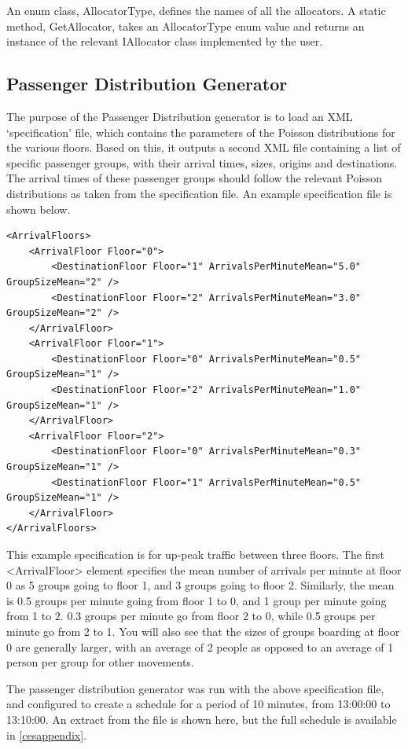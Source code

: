\documentclass{UoYCSproject}
\begin{document}
An enum class, AllocatorType, defines the names of all the allocators.  A static method, GetAllocator, takes an AllocatorType enum value and returns an instance of the relevant IAllocator class implemented by the user.

\subsection{Passenger Distribution Generator}

The purpose of the Passenger Distribution generator is to load an XML `specification' file, which contains the parameters of the Poisson distributions for the various floors.  Based on this, it outputs a second XML file containing a list of specific passenger groups, with their arrival times, sizes, origins and destinations.  The arrival times of these passenger groups should follow the relevant Poisson distributions as taken from the specification file.  An example specification file is shown below.

\lstset{language=XML, basicstyle=\ttfamily\tiny, breaklines=true, breakatwhitespace=true}
\begin{lstlisting}
<ArrivalFloors>
	<ArrivalFloor Floor="0">
		<DestinationFloor Floor="1" ArrivalsPerMinuteMean="5.0" GroupSizeMean="2" />
		<DestinationFloor Floor="2" ArrivalsPerMinuteMean="3.0" GroupSizeMean="2" />
	</ArrivalFloor>
	<ArrivalFloor Floor="1">
		<DestinationFloor Floor="0" ArrivalsPerMinuteMean="0.5" GroupSizeMean="1" />
		<DestinationFloor Floor="2" ArrivalsPerMinuteMean="1.0" GroupSizeMean="1" />
	</ArrivalFloor>
	<ArrivalFloor Floor="2">
		<DestinationFloor Floor="0" ArrivalsPerMinuteMean="0.3" GroupSizeMean="1" />
		<DestinationFloor Floor="1" ArrivalsPerMinuteMean="0.5" GroupSizeMean="1" />
	</ArrivalFloor>
</ArrivalFloors>
\end{lstlisting}

This example specification is for up-peak traffic between three floors.  The first <ArrivalFloor> element specifies the mean number of arrivals per minute at floor 0 as 5 groups going to floor 1, and 3 groups going to floor 2.  Similarly, the mean is 0.5 groups per minute going from floor 1 to 0, and 1 group per minute going from 1 to 2.  0.3 groups per minute go from floor 2 to 0, while 0.5 groups per minute go from 2 to 1.  You will also see that the sizes of groups boarding at floor 0 are generally larger, with an average of 2 people as opposed to an average of 1 person per group for other movements.

The passenger distribution generator was run with the above specification file, and configured to create a schedule for a period of 10 minutes, from 13:00:00 to 13:10:00.  An extract from the file is shown here, but the full schedule is available in \autoref{cesappendix}.
\end{document}

